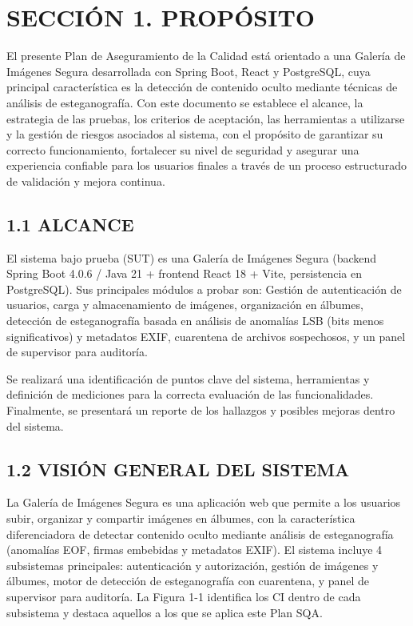 ﻿\section{SECCIÓN 1. PROPÓSITO}

El presente Plan de Aseguramiento de la Calidad está orientado a una Galería de Imágenes Segura desarrollada con Spring Boot, React y PostgreSQL, cuya principal característica es la detección de contenido oculto mediante técnicas de análisis de esteganografía. Con este documento se establece el alcance, la estrategia de las pruebas, los criterios de aceptación, las herramientas a utilizarse y la gestión de riesgos asociados al sistema, con el propósito de garantizar su correcto funcionamiento, fortalecer su nivel de seguridad y asegurar una experiencia confiable para los usuarios finales a través de un proceso estructurado de validación y mejora continua.

\subsection{1.1 ALCANCE}
El sistema bajo prueba (SUT) es una Galería de Imágenes Segura (backend Spring Boot 4.0.6 / Java 21 + frontend React 18 + Vite, persistencia en PostgreSQL). Sus principales módulos a probar son: Gestión de autenticación de usuarios, carga y almacenamiento de imágenes, organización en álbumes, detección de esteganografía basada en análisis de anomalías LSB (bits menos significativos) y metadatos EXIF, cuarentena de archivos sospechosos, y un panel de supervisor para auditoría.

Se realizará una identificación de puntos clave del sistema, herramientas y definición de mediciones para la correcta evaluación de las funcionalidades. Finalmente, se presentará un reporte de los hallazgos y posibles mejoras dentro del sistema.

\subsection{1.2 VISIÓN GENERAL DEL SISTEMA}
La Galería de Imágenes Segura es una aplicación web que permite a los usuarios subir, organizar y compartir imágenes en álbumes, con la característica diferenciadora de detectar contenido oculto mediante análisis de esteganografía (anomalías EOF, firmas embebidas y metadatos EXIF). El sistema incluye 4 subsistemas principales: autenticación y autorización, gestión de imágenes y álbumes, motor de detección de esteganografía con cuarentena, y panel de supervisor para auditoría. La Figura 1-1 identifica los CI dentro de cada subsistema y destaca aquellos a los que se aplica este Plan SQA.

